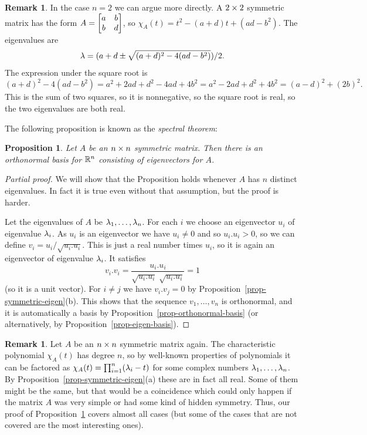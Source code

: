 \documentclass[reqno]{amsart}
\newtheorem{proposition}[theorem]{Proposition}
\theoremstyle{definition}
\newtheorem{remark}[theorem]{Remark}
\newcommand{\dfn}[1]{\emph{{#1}}\index{#1}}
\begin{document}
\begin{remark}
 In the case $n=2$ we can argue more directly.  A $2\times 2$ symmetric
 matrix has the form $A=\left[\begin{matrix} a&b \\ b&d\end{matrix}\right]$, so 
 $\chi_A(t)=t^2-(a+d)t+(ad-b^2)$.  The eigenvalues are 
 \[ \lambda = (a+d\pm\sqrt{(a+d)^2-4(ad-b^2)})/2. \]
 The expression under the square root is 
 \[ (a+d)^2-4(ad-b^2) = a^2+2ad+d^2-4ad+4b^2 =
    a^2-2ad+d^2+4b^2 = (a-d)^2+(2b)^2.
 \]
 This is the sum of two squares, so it is nonnegative, so the square
 root is real, so the two eigenvalues are both real.
\end{remark}

The following proposition is known as the \dfn{spectral theorem}:

\begin{proposition}\label{prop-symmetric-diag}
 Let $A$ be an $n\times n$ symmetric matrix.  Then there is an
 orthonormal basis for ${\mathbb{R}}^n$ consisting of eigenvectors for $A$.
\end{proposition}
\begin{proof}[Partial proof]
 We will show that the Proposition holds whenever $A$ has $n$ distinct
 eigenvalues.  In fact it is true even without that assumption, but
 the proof is harder.

 Let the eigenvalues of $A$ be $\lambda_1,\dotsc,\lambda_n$.  For each $i$ we
 choose an eigenvector $u_i$ of eigenvalue $\lambda_i$.  As $u_i$ is an
 eigenvector we have $u_i\neq 0$ and so $u_i.u_i>0$, so we can define
 $v_i=u_i/\sqrt{u_i.u_i}$.  This is just a real number times $u_i$, so
 it is again an eigenvector of eigenvalue $\lambda_i$.  It satisfies
 \[ v_i.v_i = \frac{u_i.u_i}{\sqrt{u_i.u_i}\;\sqrt{u_i.u_i}} = 1 \]
 (so it is a unit vector).  For $i\neq j$ we have $v_i.v_j=0$ by
 Proposition~\ref{prop-symmetric-eigen}(b).   This shows that the
 sequence $v_1,\dotsc,v_n$ is orthonormal, and it is automatically a
 basis by Proposition~\ref{prop-orthonormal-basis} (or alternatively,
 by Proposition~\ref{prop-eigen-basis}).
\end{proof}

\begin{remark}
 Let $A$ be an $n\times n$ symmetric matrix again.  The characteristic
 polynomial $\chi_A(t)$ has degree $n$, so by well-known properties of
 polynomials it can be factored as $\chi_A(t)=\prod_{i=1}^n(\lambda_i-t)$
 for some complex numbers $\lambda_1,\dotsc,\lambda_n$.  By
 Proposition~\ref{prop-symmetric-eigen}(a) these are in fact all
 real.  Some of them might be the same, but that would be a coincidence
 which could only happen if the matrix $A$ was very simple or had some
 kind of hidden symmetry.  Thus, our proof of
 Proposition~\ref{prop-symmetric-diag} covers almost all cases (but
 some of the cases that are not covered are the most interesting
 ones).   
\end{remark}
\end{document}
